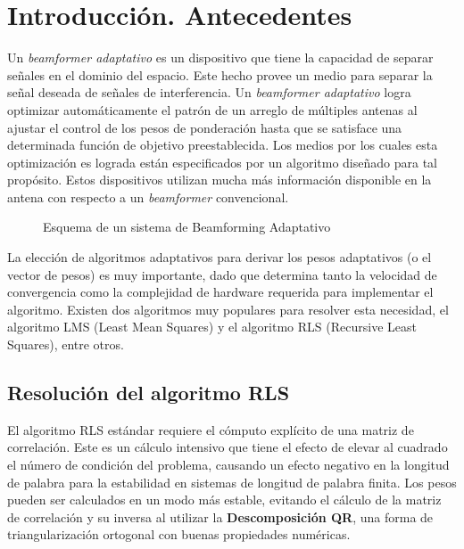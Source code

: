 \documentclass[a4paper]{article}
\begin{document}
\newpage

\section{Introducción. Antecedentes}

Un \textit{beamformer adaptativo} es un dispositivo que tiene la capacidad de separar señales en el dominio del espacio. Este hecho provee un medio para separar la señal deseada de señales de interferencia. Un \textit{beamformer adaptativo} logra optimizar automáticamente el patrón de un arreglo de múltiples antenas al ajustar el control de los pesos de ponderación hasta que se satisface una determinada función de objetivo preestablecida. Los medios por los cuales esta optimización es lograda están especificados por un algoritmo diseñado para tal propósito. Estos dispositivos utilizan mucha más información disponible en la antena con respecto a un \textit{beamformer} convencional.

\begin{figure}[htb!]
        \centering
        \caption{Esquema de un sistema de Beamforming Adaptativo}
        \label{fig:Adaptive_Beamforming}
\end{figure}

La elección de algoritmos adaptativos para derivar los pesos adaptativos (o el vector de pesos) es muy importante, dado que determina tanto la velocidad de convergencia como la complejidad de hardware requerida para implementar el algoritmo. Existen dos algoritmos muy populares para resolver esta necesidad, el algoritmo LMS (Least Mean Squares) y el algoritmo RLS (Recursive Least Squares), entre otros.

\subsection{Resolución del algoritmo RLS}

El algoritmo RLS estándar requiere el cómputo explícito de una matriz de correlación. Este es un cálculo intensivo que tiene el efecto de elevar al cuadrado el número de condición del problema, causando un efecto negativo en la longitud de palabra para la estabilidad en sistemas de longitud de palabra finita. Los pesos pueden ser calculados en un modo más estable, evitando el cálculo de la matriz de correlación y su inversa al utilizar la \textbf{Descomposición QR}, una forma de triangularización ortogonal con buenas propiedades numéricas. 
\end{document}
